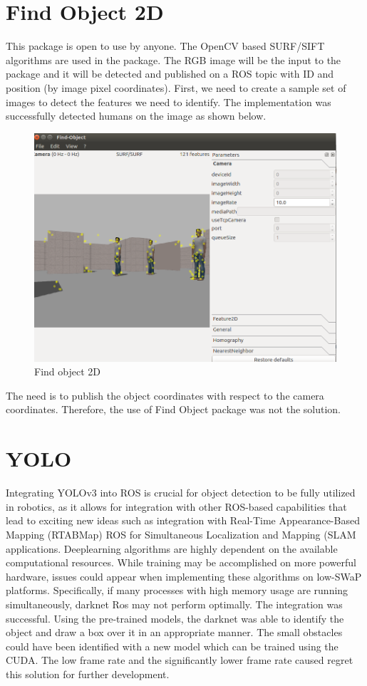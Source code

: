 \documentclass[twoside,12pt,times,onecolumn,a4paper]{report}
\begin{document}
\section{Find Object 2D}

This package is open to use by anyone. The OpenCV based SURF/SIFT 
algorithms are used in the package. The RGB image will be the input to the package and 
it will be detected and published on a ROS topic with ID and position (by image pixel 
coordinates). First, we need to create a sample set of images to detect the features we 
need to identify. The implementation was successfully detected humans on the image as 
shown below.

\begin{figure}[H]
  \centering
   \includegraphics[width=12cm]{object_detection-fo2d}
  \caption{Find object 2D}
\end{figure}

The need is to publish the object coordinates with respect to the camera 
coordinates. Therefore, the use of Find Object package was not the solution.

\section{YOLO}

Integrating YOLOv3 into ROS is crucial for object detection to be fully utilized in 
robotics, as it allows for integration with other ROS-based capabilities that lead to exciting 
new ideas such as integration with Real-Time Appearance-Based Mapping 
(RTABMap) ROS for Simultaneous Localization and Mapping (SLAM applications. Deeplearning algorithms are highly dependent on the available computational resources. While 
training may be accomplished on more powerful hardware, issues could appear when 
implementing these algorithms on low-SWaP platforms. Specifically, if many processes 
with high memory usage are running simultaneously, darknet Ros may not perform 
optimally.
The integration was successful. Using the pre-trained models, the darknet was able 
to identify the object and draw a box over it in an appropriate manner. The small obstacles 
could have been identified with a new model which can be trained using the CUDA. The 
low frame rate and the significantly lower frame rate caused regret this solution for further 
development. 
\end{document}
